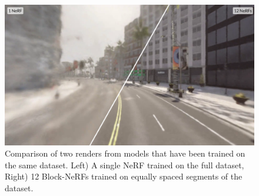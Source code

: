 \begin{figure}[!h]
    \centering
    \includegraphics[width=1.0\textwidth]{figures/block-nerf-comparison.png}
    \caption[Comparison of regular NeRF vs. Block-NeRF approach]{Comparison of two renders from models that have been trained on the same dataset. Left) A single NeRF trained on the full dataset, Right) 12 Block-NeRFs trained on equally spaced segments of the dataset.}
    \label{fig:block-nerf-comparison}
\end{figure}